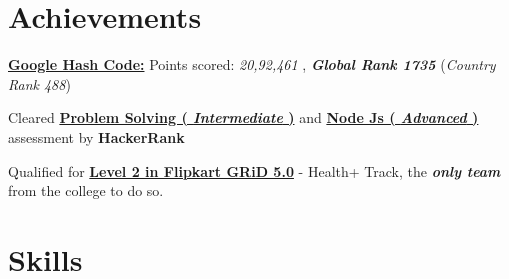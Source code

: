 \documentclass[]{resume-openfont}
\begin{document}
\section{Achievements}
\begin{bullets}
    \item  \textbf{\href{https://drive.google.com/file/d/1PHLWF7olshOeVYCrIPq_-AS-QvxKBV9m/view?usp=sharing}{Google Hash Code:}} Points scored: \textit{20,92,461} , \textbf{\textit{ Global Rank 1735}} (\textit{Country Rank 488})
    \item Cleared \textbf{\href{https://www.hackerrank.com/certificates/4099d9ae927f}{Problem Solving ( \textit{Intermediate} )}} and \textbf{\href{https://www.hackerrank.com/certificates/5ce743e1535f}{Node Js ( \textit{Advanced} )}} assessment by \textbf{HackerRank}
    \item 
    Qualified for \textbf{\href{https://drive.google.com/file/d/1nG47kEjyQut83Ep9Tz-li2tB_1fTugOQ/view?usp=sharing}{Level 2 in Flipkart GRiD 5.0}} - Health+ Track, the \textbf{\textit{only team}} from the college to do so.
\end{bullets}
\sectionsep

\section{Skills}
\begin{skillList}
    \\
\end{skillList}

    
\end{document}
